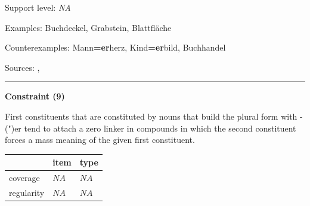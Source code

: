 \vspace{-1.35em}

\noindent
Support level: \textit{NA}

\vspace{0.3em}

\noindent
Examples: Buch{\zeroLinker}deckel, Grab{\zeroLinker}stein, Blatt{\zeroLinker}fläche

\noindent
Counterexamples: Mann\textbf{=er}herz, Kind\textbf{=er}bild, Buch{\zeroLinker}handel

\vspace{0.3em}

\noindent
Sources: \citet[229]{eisenberg_2013}, \citet[99, 108]{ortner_mueller-bollhagen_1991}

\vspace{0.35em}
\hrule




\vspace{0.4em}

\begin{center}
\textbf{Constraint (9)}
\end{center}

\noindent
First constituents that are constituted by nouns that build the plural form with -(")er tend to attach a zero linker in compounds in which the second constituent forces a mass meaning of the given first constituent.
\vspace{0.5em}


\vspace{-0.25em}

\begin{table}[!ht]
\begin{center}
\setlength{\extrarowheight}{1pt}
\begin{tabularx}{\columnwidth}{|X|X|X|}
\hline
 & item & type \\
\hline
 coverage & $NA$ & $NA$ \\
\hline
 regularity & $NA$ & $NA$ \\
\hline
\end{tabularx}
\end{center}
\end{table}

